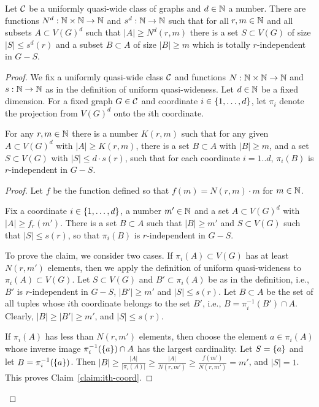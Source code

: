 \begin{proposition}\label{prop:uqw-tuples}
	Let $\cal C$ be a uniformly quasi-wide class of graphs and $d\in\N$ a number.
	There are functions $N^d:\N\times\N\to\N$ and $s^d:\N\to \N$
	such that for all $r,m\in\N$ and all subsets $A\subset V(G)^d$
	such that $|A|\ge N^d(r,m)$ there  is a set $S\subset V(G)$
	of size $|S|\le s^d(r)$ and a subset $B\subset A$ of size $|B|\ge m$ which is totally $r$-independent in $G-S$.
\end{proposition}
\begin{proof}We fix a uniformly quasi-wide class $\cal C$ and functions $N:\N\times\N\to \N$
	and $s:\N\to\N$ as in the definition of uniform quasi-wideness.
	Let $d\in \N$ be a fixed dimension.
		For a fixed graph $G\in \cal C$  and
	  coordinate $i\in\set{1,\ldots,d}$, let $\pi_i$ denote the projection from $V(G)^d$ onto the $i$th coordinate.

	


\begin{lemma}\label{lem:step1} For any $r,m\in \N$ there is a number $K(r,m)$ such that
	for any given $A\subset V(G)^d$ with $|A|\ge K(r,m)$,
	there is a set $B\subset A$ with $|B|\ge m$, and a set $S\subset V(G)$ with $|S|\le d\cdot s(r)$, 
	such that for each coordinate $i=1..d$, 
 $\pi_i(B)$ is $r$-independent in $G-S$. 
\end{lemma}
\begin{proof}

Let $f$ be the function defined so that $f(m)=N(r,m)\cdot m$ for $m\in\N$.

\begin{claim}\label{claim:ith-coord}
Fix a coordinate $i\in\set{1,\ldots,d}$, a number $m'\in\N$ and a  set $A\subset V(G)^d$ with  $|A|\ge f_r(m')$.
There is a set $B\subset A$ such that $|B|\ge m'$
and $S\subset V(G)$ such that $|S|\le  s(r)$,
so that  $\pi_i(B)$ is $r$-independent in $G-S$.	
\end{claim}
To prove the claim, 
we consider two cases.
If $\pi_i(A)\subset V(G)$ has at least $N(r,m')$ elements, then we apply the definition of uniform quasi-wideness to $\pi_i(A)\subset V(G)$. Let $S\subset V(G)$ and $B'\subset \pi_i(A)$
be as in the definition, i.e., $B'$ is $r$-independent in $G-S$,
$|B'|\ge m'$ and $|S|\le s(r)$. Let $B\subset A$ be the set of all tuples 
whose $i$th coordinate belongs to the set $B'$, i.e., $B=\pi_i^{-1}(B')\cap A$.
Clearly, $|B|\ge |B'|\ge m'$, and $|S|\le s(r)$.

If $\pi_i(A)$ has less than $N(r,m')$ elements, then choose the element $a\in\pi_i(A)$ whose inverse image $\pi_i^{-1}(\set a)\cap A$ has the largest cardinality. Let $S=\set{a}$ 
and let $B=\pi_i^{-1}(\set a)$. Then $|B|\ge \frac{|A|}{|\pi_i(A)|}\ge \frac{|A|}{N(r,m')}\ge \frac {f(m')}{N(r,m')}=m'$,
and $|S|=1$. This proves Claim~\ref{claim:ith-coord}.



\end{proof}
\end{proof}
